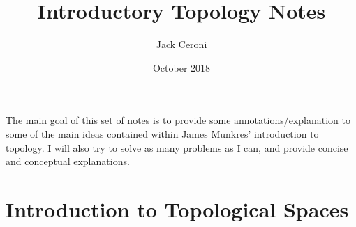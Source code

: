 \documentclass{article}
\title{Introductory Topology Notes}
\author{Jack Ceroni}
\date{October 2018}
\begin{document}
\maketitle
\newpage

\noindent
The main goal of this set of notes is to provide some annotations/explanation to some of the main ideas contained within James Munkres' introduction to topology. I will also try to solve as many problems as I can, and provide concise and conceptual explanations.\newline


\section{Introduction to Topological Spaces}

\vspace{6mm}
\end{document}
